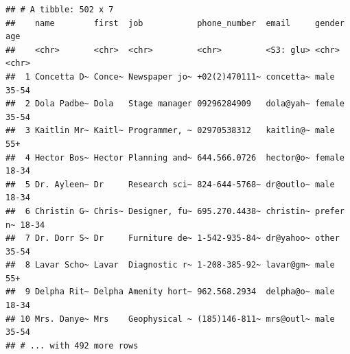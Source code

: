 \documentclass[]{book}
\begin{document}
\begin{verbatim}
## # A tibble: 502 x 7
##    name        first  job           phone_number  email     gender    age  
##    <chr>       <chr>  <chr>         <chr>         <S3: glu> <chr>     <chr>
##  1 Concetta D~ Conce~ Newspaper jo~ +02(2)470111~ concetta~ male      35-54
##  2 Dola Padbe~ Dola   Stage manager 09296284909   dola@yah~ female    35-54
##  3 Kaitlin Mr~ Kaitl~ Programmer, ~ 02970538312   kaitlin@~ male      55+  
##  4 Hector Bos~ Hector Planning and~ 644.566.0726  hector@o~ female    18-34
##  5 Dr. Ayleen~ Dr     Research sci~ 824-644-5768~ dr@outlo~ male      18-34
##  6 Christin G~ Chris~ Designer, fu~ 695.270.4438~ christin~ prefer n~ 18-34
##  7 Dr. Dorr S~ Dr     Furniture de~ 1-542-935-84~ dr@yahoo~ other     35-54
##  8 Lavar Scho~ Lavar  Diagnostic r~ 1-208-385-92~ lavar@gm~ male      55+  
##  9 Delpha Rit~ Delpha Amenity hort~ 962.568.2934  delpha@o~ male      18-34
## 10 Mrs. Danye~ Mrs    Geophysical ~ (185)146-811~ mrs@outl~ male      35-54
## # ... with 492 more rows
\end{verbatim}


\end{document}
